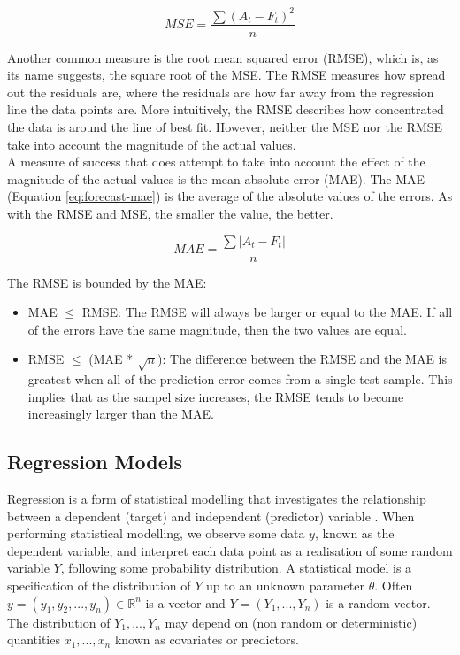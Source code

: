 \begin{equation}
\label{eq:forecast-mse}
    MSE = \frac{\sum(A_t-F_t)^2}{n}
\end{equation}

Another common measure is the root mean squared error (RMSE), which is, as its name suggests, the square root of the MSE. The RMSE measures how spread out the residuals are, where the residuals are how far away from the regression line the data points are. More intuitively, the RMSE describes how concentrated the data is around the line of best fit. However, neither the MSE nor the RMSE take into account the magnitude of the actual values. \\

A measure of success that does attempt to take into account the effect of the magnitude of the actual values is the mean absolute error (MAE). The MAE (Equation \ref{eq:forecast-mae}) is the average of the absolute values of the errors. As with the RMSE and MSE, the smaller the value, the better.

\begin{equation}
\label{eq:forecast-mae}
    MAE = \frac{\sum|A_t-F_t|}{n}
\end{equation}

The RMSE is bounded by the MAE:

\begin{itemize}
    \item MAE $\leq$ RMSE: The RMSE will always be larger or equal to the MAE. If all of the errors have the same magnitude, then the two values are equal.
    \item RMSE $\leq$ (MAE * $\sqrt{n}$): The difference between the RMSE and the MAE is greatest when all of the prediction error comes from a single test sample. This implies that as the sampel size increases, the RMSE tends to become increasingly larger than the MAE. 
\end{itemize}

\subsection{Regression Models}
\label{section:regression-models-research}

Regression is a form of statistical modelling that investigates the relationship between a dependent (target) and independent (predictor) variable \cite{regression-techniques}. When performing statistical modelling, we observe some data $y$, known as the dependent variable, and interpret each data point as a realisation of some random variable $Y$, following some probability distribution. A statistical model is a specification of the distribution of $Y$ up to an unknown parameter $\theta$. Often $y = (y_1, y_2, ..., y_n) \in \mathbb{R} ^ n$ is a vector and $Y = (Y_1, ..., Y_n)$ is a random vector. The distribution of $Y_1, ..., Y_n$ may depend on (non random or deterministic) quantities $x_1, ..., x_n$ known as covariates or predictors. \\

